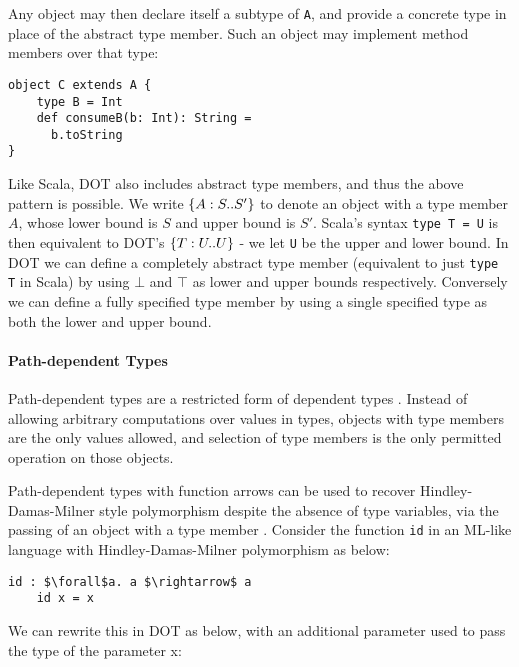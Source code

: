 \noindent Any object may then declare itself a subtype of \texttt{A}, and
provide a concrete type in place of the abstract type member. Such an object may
implement method members over that type:

\begin{minipage}{\linewidth}
\begin{lstlisting}[mathescape]
object C extends A {
    type B = Int
    def consumeB(b: Int): String =
      b.toString
}
\end{lstlisting}
\end{minipage}

\noindent Like Scala, DOT also includes abstract type members, and thus the
above pattern is possible. We write $\{A : S .. S'\}$ to denote an object with a
type member $A$, whose lower bound is $S$ and upper bound is $S'$. Scala's
syntax \texttt{type T = U} is then equivalent to DOT's $\{T : U .. U\}$ - we let
\texttt{U} be the upper and lower bound. In DOT we can define a completely
abstract type member (equivalent to just \texttt{type T} in Scala) by using
$\bot$ and $\top$ as lower and upper bounds respectively. Conversely we can
define a fully specified type member by using a single specified type as both
the lower and upper bound.

\paragraph{Path-dependent Types}
Path-dependent types are a restricted form of dependent types \cite{AGORS16}.
Instead of allowing arbitrary computations over values in types, objects with
type members are the only values allowed, and selection of type members is the
only permitted operation on those objects.

Path-dependent types with function arrows can be used to recover
Hindley-Damas-Milner style polymorphism despite the absence of type variables,
via the passing of an object with a type member \cite{AGORS16}. Consider the
function \texttt{id} in an ML-like language with Hindley-Damas-Milner
polymorphism as below:

\begin{minipage}{\linewidth}
\begin{lstlisting}[mathescape]
    id : $\forall$a. a $\rightarrow$ a
    id x = x
\end{lstlisting}
\end{minipage}

We can rewrite this in DOT as below, with an additional parameter used to pass
the type of the parameter x:

